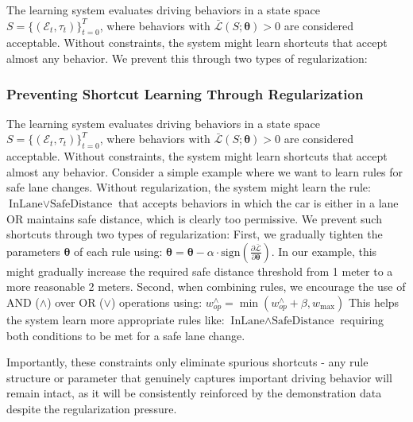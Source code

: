 The learning system evaluates driving behaviors in a state space $S = \{(\mathcal{E}_t, \tau_t)\}_{t=0}^T$, where behaviors with $\bar{\mathcal{L}}(S; \boldsymbol{\theta}) > 0$ are considered acceptable. Without constraints, the system might learn shortcuts that accept almost any behavior. We prevent this through two types of regularization:

\subsubsection{Preventing Shortcut Learning Through Regularization}

The learning system evaluates driving behaviors in a state space $S = \{(\mathcal{E}_t, \tau_t)\}_{t=0}^T$, where behaviors with $\bar{\mathcal{L}}(S; \boldsymbol{\theta}) > 0$ are considered acceptable. Without constraints, the system might learn shortcuts that accept almost any behavior.
Consider a simple example where we want to learn rules for safe lane changes. Without regularization, the system might learn the rule:
$\text{InLane} \lor \text{SafeDistance}$
that accepts behaviors in which the car is either in a lane OR maintains safe distance, which is clearly too permissive. We prevent such shortcuts through two types of regularization: First, we gradually tighten the parameters $\boldsymbol{\theta}$ of each rule using:
$
    \boldsymbol{\theta} = \boldsymbol{\theta} - \alpha \cdot \text{sign}\left(\frac{\partial \bar{\mathcal{L}}}{\partial \boldsymbol{\theta}}\right).
$
In our example, this might gradually increase the required safe distance threshold from 1 meter to a more reasonable 2 meters. Second, when combining rules, we encourage the use of AND ($\land$) over OR ($\lor$) operations using:
$
    w_{op}^{\land} = \min(w_{op}^{\land} + \beta, w_{\max})
$
This helps the system learn more appropriate rules like:
$\text{InLane} \land \text{SafeDistance}$
requiring both conditions to be met for a safe lane change.

Importantly, these constraints only eliminate spurious shortcuts - any rule structure or parameter that genuinely captures important driving behavior will remain intact, as it will be consistently reinforced by the demonstration data despite the regularization pressure.